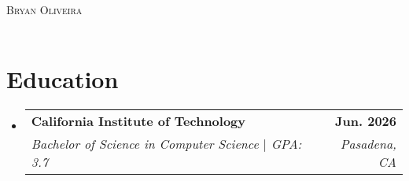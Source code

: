 \documentclass[letterpaper,11pt]{article}
\makeatletter
\newcommand{\resumeSubheading}[4]{
  \vspace{-2pt}\item
    \begin{tabular*}{1.0\textwidth}[t]{l@{\extracolsep{\fill}}r}
      \textbf{#1} & \textbf{\small #2} \\
      \textit{\small#3} & \textit{\small #4} \\
    \end{tabular*}\vspace{-7pt}
}
\newcommand{\resumeSubHeadingListStart}{\begin{itemize}[leftmargin=0.0in, label={}]}
\newcommand{\resumeSubHeadingListEnd}{\end{itemize}}
\makeatother
\begin{document}

\begin{center}
    {\Huge \scshape Bryan Oliveira} \\ \vspace{1pt}
    \small
    \href{https://github.com/BryOliveira}{\raisebox{-0.1\height}{\faGithub \scriptsize} \underline{}} ~
    \href{mailto:bryoliveira2004@gmail.com}{\raisebox{-0.1\height}{\faEnvelope \scriptsize} \underline{}} ~
    \href{https://linkedin.com/in/bryan-r-oliveira/}{\raisebox{-0.1\height}{\faLinkedin \scriptsize} \underline{}}
    \vspace{-12pt}
\end{center}


\section{Education}
  \resumeSubHeadingListStart
    \resumeSubheading
      {California Institute of Technology}{Jun. 2026}
      {Bachelor of Science in Computer Science $|$ GPA: 3.7}{Pasadena, CA}
  \resumeSubHeadingListEnd
\vspace{-14pt}

\end{document}
